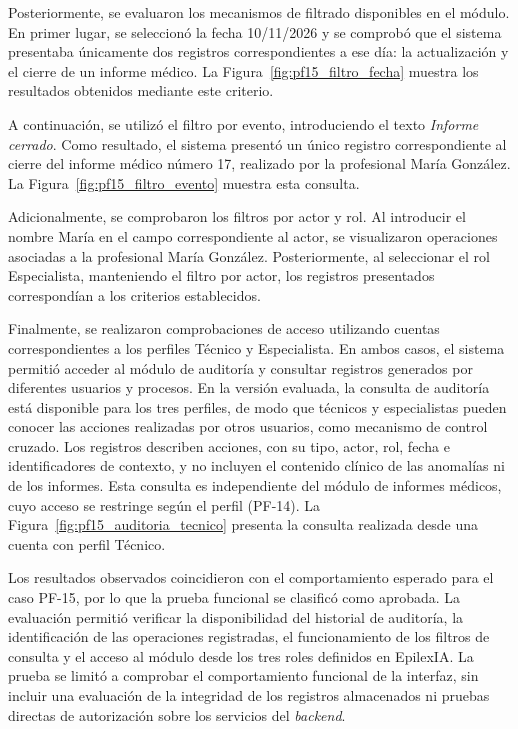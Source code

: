 Posteriormente, se evaluaron los mecanismos de filtrado disponibles en el módulo. En primer lugar, se seleccionó la fecha 10/11/2026 y se comprobó que el sistema presentaba únicamente dos registros correspondientes a ese día: la actualización y el cierre de un informe médico. La Figura~\ref{fig:pf15_filtro_fecha} muestra los resultados obtenidos mediante este criterio.

A continuación, se utilizó el filtro por evento, introduciendo el texto \textit{Informe cerrado}. Como resultado, el sistema presentó un único registro correspondiente al cierre del informe médico número 17, realizado por la profesional María González. La Figura~\ref{fig:pf15_filtro_evento} muestra esta consulta.

Adicionalmente, se comprobaron los filtros por actor y rol. Al introducir el nombre María en el campo correspondiente al actor, se visualizaron operaciones asociadas a la profesional María González. Posteriormente, al seleccionar el rol Especialista, manteniendo el filtro por actor, los registros presentados correspondían a los criterios establecidos.

Finalmente, se realizaron comprobaciones de acceso utilizando cuentas correspondientes a los perfiles Técnico y Especialista. En ambos casos, el sistema permitió acceder al módulo de auditoría y consultar registros generados por diferentes usuarios y procesos. En la versión evaluada, la consulta de auditoría está disponible para los tres perfiles, de modo que técnicos y especialistas pueden conocer las acciones realizadas por otros usuarios, como mecanismo de control cruzado. Los registros describen acciones, con su tipo, actor, rol, fecha e identificadores de contexto, y no incluyen el contenido clínico de las anomalías ni de los informes. Esta consulta es independiente del módulo de informes médicos, cuyo acceso se restringe según el perfil (PF-14). La Figura~\ref{fig:pf15_auditoria_tecnico} presenta la consulta realizada desde una cuenta con perfil Técnico.

Los resultados observados coincidieron con el comportamiento esperado para el caso PF-15, por lo que la prueba funcional se clasificó como aprobada. La evaluación permitió verificar la disponibilidad del historial de auditoría, la identificación de las operaciones registradas, el funcionamiento de los filtros de consulta y el acceso al módulo desde los tres roles definidos en EpilexIA. La prueba se limitó a comprobar el comportamiento funcional de la interfaz, sin incluir una evaluación de la integridad de los registros almacenados ni pruebas directas de autorización sobre los servicios del \textit{backend}.


